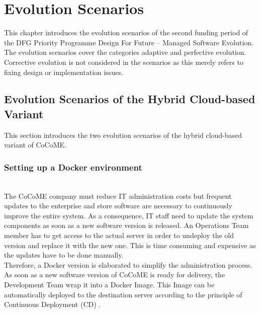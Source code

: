 \chapter{Evolution Scenarios}
\label{c:evolution scenarios}

This chapter introduces the evolution scenarios of the second funding period of the DFG Priority Programme
Design For Future -- Managed Software Evolution.
The evolution scenarios cover the categories adaptive and perfective evolution. Corrective evolution is not considered in the scenarios as this merely refers to fixing design or implementation issues.

\section{Evolution Scenarios of the Hybrid Cloud-based Variant}
This section introduces the two evolution scenarios of the hybrid cloud-based variant of
CoCoME.
\subsection{Setting up a Docker environment}
~\\The CoCoME company must reduce IT administration costs but frequent updates to the enterprise and store software are necessary to continuously improve the entire system. As a consequence, IT staff need to update the system components as soon as a new software version is released. An Operations Team member has to get access to the actual server in order to undeploy the old version and replace it with the new one. This is time consuming and expensive as the updates have to be done manually.\\
Therefore, a Docker version is elaborated to simplify the administration process. As soon as a new software version of CoCoME is ready for delivery, the Development Team wrap it into a Docker Image. This Image can be automatically deployed to the destination server according to the principle of Continuous Deployment (CD) \cite{olsson2012climbing}. 




